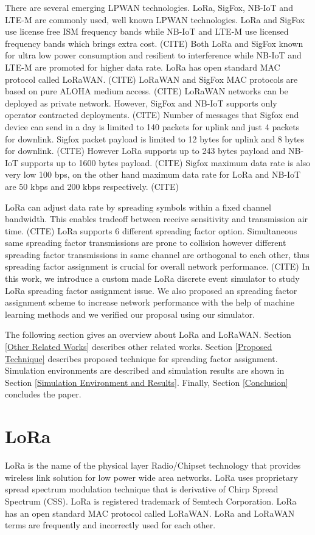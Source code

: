 \documentclass[conference]{IEEEtran}
\begin{document}
\par There are several emerging LPWAN technologies. LoRa, SigFox, NB-IoT and LTE-M are commonly used, well known LPWAN technologies. LoRa and SigFox use license free ISM frequency bands while NB-IoT and LTE-M use licensed frequency bands which brings extra cost. (CITE) Both LoRa and SigFox known for ultra low power consumption and resilient to interference while NB-IoT and LTE-M are promoted for higher data rate. LoRa has open standard MAC protocol called LoRaWAN. (CITE) LoRaWAN and SigFox MAC protocols are based on pure ALOHA medium access. (CITE) LoRaWAN networks can be deployed as private network. However, SigFox and NB-IoT supports only operator contracted deployments. (CITE) Number of messages that Sigfox end device can send in a day is limited to 140 packets for uplink and just 4 packets for downlink. Sigfox packet payload is limited to 12 bytes for uplink and 8 bytes for downlink. (CITE) However LoRa supports up to 243 bytes payload and NB-IoT supports up to 1600 bytes payload. (CITE) Sigfox maximum data rate is also very low 100 bps, on the other hand maximum data rate for LoRa and NB-IoT are 50 kbps and 200 kbps respectively. (CITE) 

\par LoRa can adjust data rate by spreading symbols within a fixed channel bandwidth. This enables tradeoff between receive sensitivity and transmission air time. (CITE) LoRa supports 6 different spreading factor option. Simultaneous same spreading factor transmissions are prone to collision however different spreading factor transmissions in same channel are orthogonal to each other, thus spreading factor assignment is crucial for overall network performance. (CITE) In this work, we introduce a custom made LoRa discrete event simulator to study LoRa spreading factor assignment issue. We also proposed an spreading factor assignment scheme to increase network performance with the help of machine learning methods and we verified our proposal using our simulator.

\par The following section gives an overview about LoRa and LoRaWAN. Section \ref{Other Related Works} describes other related works. Section \ref{Proposed Technique} describes proposed technique for spreading factor assignment. Simulation environments are described and simulation results are shown in Section \ref{Simulation Environment and Results}. Finally, Section \ref{Conclusion} concludes the paper.


\section{LoRa} \label{LoRa}
\par LoRa is the name of the physical layer Radio/Chipset technology that provides wireless link solution for low power wide area networks. LoRa uses proprietary spread spectrum modulation technique that is derivative of Chirp Spread Spectrum (CSS). LoRa is registered trademark of Semtech Corporation. LoRa has an open standard MAC protocol called LoRaWAN. LoRa and LoRaWAN terms are frequently and incorrectly used for each other.
\end{document}

